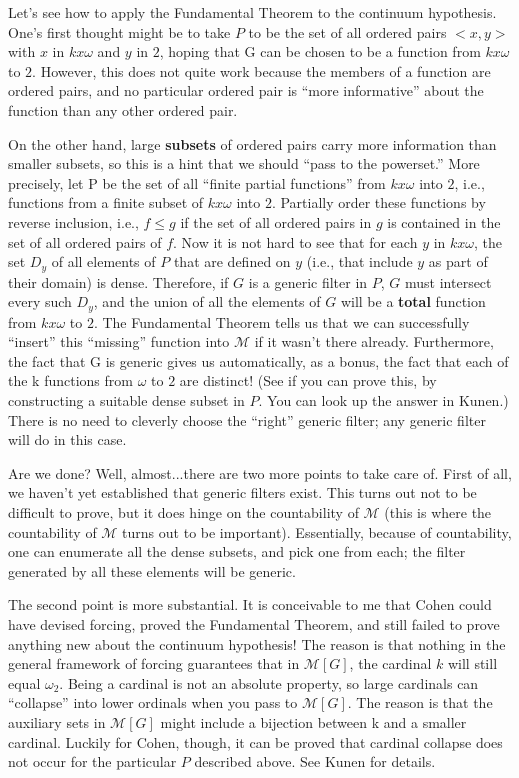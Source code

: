 \documentclass[10pt]{article}
\begin{document}
Let's see how to apply the Fundamental Theorem to the continuum hypothesis. One's first thought might be to take $P$ to be the set of all ordered pairs $<x,y>$ with $x$ in $k x \omega$ and $y$ in $2$, hoping that G can be chosen to be a function from $k x \omega$ to $2$. However, this does not quite work because the members of a function are ordered pairs, and no particular ordered pair is ``more informative'' about the function than any other ordered pair.

On the other hand, large \textbf{subsets} of ordered pairs carry more information than smaller subsets, so this is a hint that we should ``pass to the powerset.'' More precisely, let P be the set of all ``finite partial functions'' from $k x \omega$ into $2$, i.e., functions from a finite subset of $k x \omega$ into $2$. Partially order these functions by reverse inclusion, i.e., $f \leq g$ if the set of all ordered pairs in $g$ is contained in the set of all ordered pairs of $f$. Now it is not hard to see that for each $y$ in $k x \omega$, the set $D_y$ of all elements of $P$ that are defined on $y$ (i.e., that include $y$ as part of their domain) is dense. Therefore, if $G$ is a generic filter in $P$, $G$ must intersect every such $D_y$, and the union of all the elements of $G$ will be a \textbf{total} function from $k x \omega$ to $2$. The Fundamental Theorem tells us that we can successfully ``insert'' this ``missing'' function into $\mathcal{M}$ if it wasn't there already. Furthermore, the fact that G is generic gives us automatically, as a bonus, the fact that each of the k functions from $\omega$ to $2$ are distinct! (See if you can prove this, by constructing a suitable dense subset in $P$. You can look up the answer in Kunen.) There is no need to cleverly choose the ``right'' generic filter; any generic filter will do in this case.

Are we done? Well, almost...there are two more points to take care of. First of all, we haven't yet established that generic filters exist. This turns out not to be difficult to prove, but it does hinge on the countability of $\mathcal{M}$ (this is where the countability of $\mathcal{M}$ turns out to be important). Essentially, because of countability, one can enumerate all the dense subsets, and pick one from each; the filter generated by all these elements will be generic.

The second point is more substantial. It is conceivable to me that Cohen could have devised forcing, proved the Fundamental Theorem, and still failed to prove anything new about the continuum hypothesis! The reason is that nothing in the general framework of forcing guarantees that in $\mathcal{M}[G]$, the cardinal $k$ will still equal $\omega_2$. Being a cardinal is not an absolute property, so large cardinals can ``collapse'' into lower ordinals when you pass to $\mathcal{M}[G]$. The reason is that the auxiliary sets in $\mathcal{M}[G]$ might include a bijection between k and a smaller cardinal. Luckily for Cohen, though, it can be proved that cardinal collapse does not occur for the particular $P$ described above. See Kunen for details.
\end{document}
